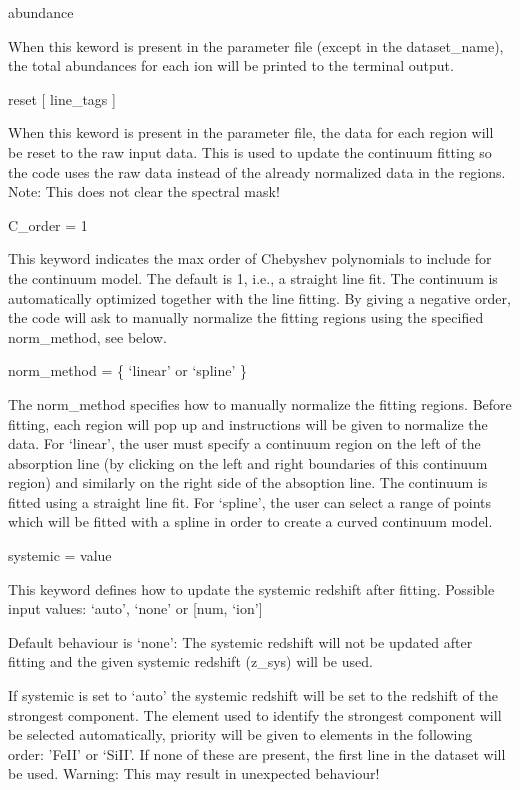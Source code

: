 \documentclass[letterpaper,10pt,english]{sphinxmanual}
\begin{document}
abundance

When this keword is present in the parameter file (except in the dataset\_name), the total abundances for each ion will be printed to the terminal output.

reset  {[} line\_tags {]}

When this keword is present in the parameter file, the data for each region will be reset to the raw input data. This is used to update the continuum fitting so the code uses the raw data instead of the already normalized data in the regions. Note: This does not clear the spectral mask!

C\_order = 1

This keyword indicates the max order of Chebyshev polynomials to include for the continuum model. The default is 1, i.e., a straight line fit. The continuum is automatically optimized together with the line fitting.
By giving a negative order, the code will ask to manually normalize the fitting regions using the specified norm\_method, see below.

norm\_method = \{ ‘linear’  or  ‘spline’ \}

The norm\_method specifies how to manually normalize the fitting regions. Before fitting, each region will pop up and instructions will be given to normalize the data.
For ‘linear’, the user must specify a continuum region on the left of the absorption line (by clicking on the left and right boundaries of this continuum region) and similarly on the right side of the absoption line. The continuum is fitted using a straight line fit.
For ‘spline’, the user can select a range of points which will be fitted with a spline in order to create a curved continuum model.

systemic = value

This keyword defines how to update the systemic redshift after fitting.
Possible input values: ‘auto’, ‘none’ or  {[}num, ‘ion’{]}

Default behaviour is ‘none’: The systemic redshift will not be updated after fitting and the given systemic redshift (z\_sys) will be used.

If systemic is set to ‘auto’ the systemic redshift will be set to the redshift of the strongest component. The element used to identify the strongest component will be selected automatically, priority will be given to elements in the following order: ’FeII’ or ‘SiII’. If none of these are present, the first line in the dataset will be used. Warning: This may result in unexpected behaviour!
\end{document}
